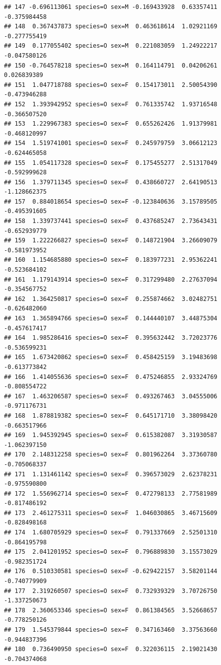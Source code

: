 \documentclass{beamer}\usepackage[]{graphicx}\usepackage[]{color}
\makeatletter
\newenvironment{kframe}{%
 \def\at@end@of@kframe{}%
 \ifinner\ifhmode%
  \def\at@end@of@kframe{\end{minipage}}%
  \begin{minipage}{\columnwidth}%
 \fi\fi%
 \def\FrameCommand##1{\hskip\@totalleftmargin \hskip-\fboxsep
 \colorbox{shadecolor}{##1}\hskip-\fboxsep
     \hskip-\linewidth \hskip-\@totalleftmargin \hskip\columnwidth}%
 \MakeFramed {\advance\hsize-\width
   \@totalleftmargin\z@ \linewidth\hsize
   \@setminipage}}%
 {\par\unskip\endMakeFramed%
 \at@end@of@kframe}
\newenvironment{knitrout}{}{} %
\makeatother
\begin{document}
\begin{frame}[fragile]
\begin{knitrout}
\begin{kframe}
\begin{verbatim}
## 147 -0.696113061 species=O sex=M -0.169433928  0.63357411    -0.375984458
## 148  0.367437873 species=O sex=M  0.463618614  1.02921169    -0.277755419
## 149  0.177055402 species=O sex=M  0.221083059  1.24922217    -0.047580126
## 150 -0.764578218 species=O sex=M  0.164114791  0.04206261     0.026839389
## 151  1.047718788 species=O sex=F  0.154173011  2.50054390    -0.473946288
## 152  1.393942952 species=O sex=F  0.761335742  1.93716548    -0.366507520
## 153  1.229967383 species=O sex=F  0.655262426  1.91379981    -0.468120997
## 154  1.519741001 species=O sex=F  0.245979759  3.06612123    -0.624465058
## 155  1.054117328 species=O sex=F  0.175455277  2.51317049    -0.592999628
## 156  1.379711345 species=O sex=F  0.438660727  2.64190513    -1.128662375
## 157  0.884018654 species=O sex=F -0.123840636  3.15789505    -0.495391605
## 158  1.339737441 species=O sex=F  0.437685247  2.73643431    -0.652939779
## 159  1.222266827 species=O sex=F  0.148721904  3.26609079    -0.581973952
## 160  1.154685880 species=O sex=F  0.183977231  2.95362241    -0.523684102
## 161  1.179143914 species=O sex=F  0.317299480  2.27637094    -0.354567752
## 162  1.364250817 species=O sex=F  0.255874662  3.02482751    -0.626482060
## 163  1.365894766 species=O sex=F  0.144440107  3.44875304    -0.457617417
## 164  1.985286416 species=O sex=F  0.395632442  3.72023776    -0.536599231
## 165  1.673420862 species=O sex=F  0.458425159  3.19483698    -0.613773842
## 166  1.414055636 species=O sex=F  0.475246855  2.93324769    -0.808554722
## 167  1.463206587 species=O sex=F  0.493267463  3.04555006    -0.971176731
## 168  1.878819382 species=O sex=F  0.645171710  3.38098420    -0.663517966
## 169  1.945392945 species=O sex=F  0.615382087  3.31930587    -1.062397150
## 170  2.148312258 species=O sex=F  0.801962264  3.37360780    -0.705068337
## 171  1.131461142 species=O sex=F  0.396573029  2.62378231    -0.975590800
## 172  1.556962714 species=O sex=F  0.472798133  2.77581989    -0.817486192
## 173  2.461275311 species=O sex=F  1.046030865  3.46715609    -0.828498168
## 174  1.680705929 species=O sex=F  0.791337669  2.52501310    -0.864195798
## 175  2.041201952 species=O sex=F  0.796889830  3.15573029    -0.982351724
## 176  0.510330581 species=O sex=F -0.629422157  3.58201144    -0.740779909
## 177  2.319260507 species=O sex=F  0.732939329  3.70726750    -1.337250673
## 178  2.360653346 species=O sex=F  0.861384565  3.52668657    -0.778250126
## 179  1.545379844 species=O sex=F  0.347163460  3.37563660    -0.944837396
## 180  0.736490950 species=O sex=F  0.322036115  2.19021430    -0.704374068

\end{verbatim}
\end{kframe}
\end{knitrout}
\end{frame}
\end{document}
